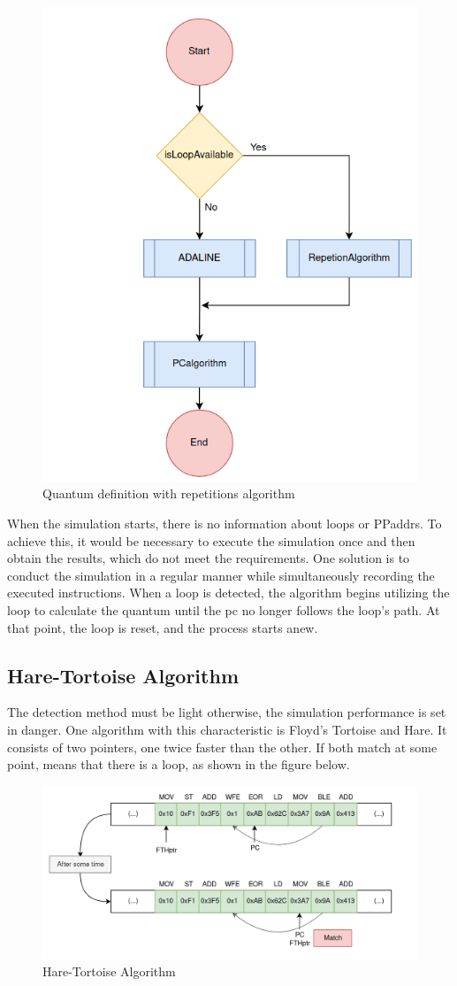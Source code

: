 \begin{figure}[h!]
	\centering
 	\includegraphics[width=0.5\linewidth]{Images/ADA_and_REP.png}
 	\caption{Quantum definition with repetitions algorithm}
	 \label{fig_ADA_and_REP}
\end{figure}


When the simulation starts, there is no information about loops or PPaddrs. To achieve this, it would be necessary to execute the simulation 
once and then obtain the results, which do not meet the requirements. One solution is to conduct the simulation in a regular manner while 
simultaneously recording the executed instructions. When a loop is detected, the algorithm begins utilizing the loop to calculate the quantum 
until the \gls{pc} no longer follows the loop's path. At that point, the loop is reset, and the process starts anew.

\subsection{Hare-Tortoise Algorithm}

The detection method must be light otherwise, the simulation performance is set in danger. One algorithm with this characteristic is Floyd's 
Tortoise and Hare. It consists of two pointers, one twice faster than the other. If both match at some point, means that there is a 
loop, as shown in the figure below.

\begin{figure}[H]
	\centering
 	\includegraphics[width=0.8\linewidth]{Images/FTH_algorithm.png}
 	\caption{Hare-Tortoise Algorithm}
	 \label{fig_FTH_algorithm}
\end{figure}

